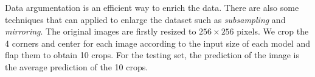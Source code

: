 Data argumentation is an efficient way to enrich the data. There are also some techniques that can applied to enlarge the dataset such as \emph{subsampling} and \emph{mirroring}. The original images are firstly resized to $256\times 256$ pixels. We crop the 4 corners and center for each image according to the input size of each model and flap them to obtain 10 crops. For the testing set, the prediction of the image is the average prediction of the 10 crops.
